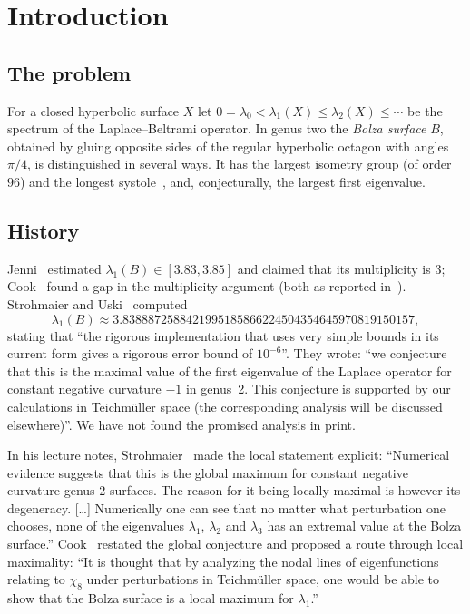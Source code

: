 \documentclass[11pt]{amsart}
\theoremstyle{definition}
\theoremstyle{remark}
\begin{document}
\maketitle
\tableofcontents

\section{Introduction}\label{sec:intro}

\subsection{The problem}
For a closed hyperbolic surface $X$ let $0=\lambda_0<\lambda_1(X)\le\lambda_2(X)\le\cdots$ be the
spectrum of the Laplace--Beltrami operator. In genus two the \emph{Bolza surface} $B$, obtained
by gluing opposite sides of the regular hyperbolic octagon with angles $\pi/4$, is
distinguished in several ways. It has the largest isometry group (of order $96$) and the
longest systole~\cite{Str16,SU13}, and, conjecturally, the largest first eigenvalue.

\subsection{History}
Jenni~\cite{Jen84} estimated $\lambda_1(B)\in[3.83,3.85]$ and claimed that its multiplicity
is $3$; Cook~\cite{Coo18} found a gap in the multiplicity argument (both as reported
in~\cite{SU13,FBP-K}). Strohmaier and Uski~\cite[\S5]{SU13} computed
\[
\lambda_1(B)\approx 3.8388872588421995185866224504354645970819150157,
\]
stating that ``the rigorous implementation that uses very simple bounds in its current form
gives a rigorous error bound of $10^{-6}$''. They wrote: ``we conjecture that this is the
maximal value of the first eigenvalue of the Laplace operator for constant negative
curvature $-1$ in genus~2. This conjecture is supported by our calculations in Teichm\"uller
space (the corresponding analysis will be discussed elsewhere)''. We have not found the
promised analysis in print.

In his lecture notes, Strohmaier~\cite[pp.~22--23]{Str16} made the local statement explicit:
``Numerical evidence suggests that this is the global maximum for constant negative curvature
genus 2 surfaces. The reason for it being locally maximal is however its degeneracy. [\dots]
Numerically one can see that no matter what perturbation one chooses, none of the eigenvalues
$\lambda_1$, $\lambda_2$ and $\lambda_3$ has an extremal value at the Bolza surface.''
Cook~\cite[Conj.~5.1]{Coo18} restated the global conjecture and proposed a route through local
maximality: ``It is thought that by analyzing the nodal lines of eigenfunctions relating to
$\chi_8$ under perturbations in Teichm\"uller space, one would be able to show that the Bolza
surface is a local maximum for $\lambda_1$.''
\end{document}
